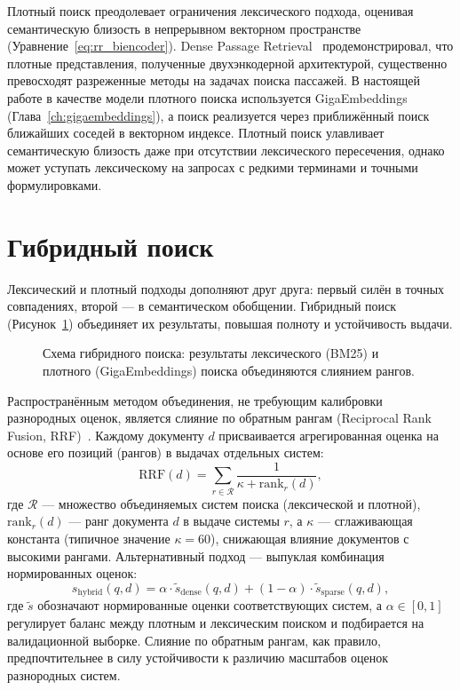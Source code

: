 Плотный поиск преодолевает ограничения лексического подхода, оценивая семантическую близость в непрерывном векторном пространстве (Уравнение~\ref{eq:rr_biencoder}).
Dense Passage Retrieval~\cite{2004.04906} продемонстрировал, что плотные представления, полученные двухэнкодерной архитектурой, существенно превосходят разреженные методы на задачах поиска пассажей.
В настоящей работе в качестве модели плотного поиска используется GigaEmbeddings (Глава~\ref{ch:gigaembeddings}), а поиск реализуется через приближённый поиск ближайших соседей в векторном индексе.
Плотный поиск улавливает семантическую близость даже при отсутствии лексического пересечения, однако может уступать лексическому на запросах с редкими терминами и точными формулировками.

\section{Гибридный поиск}\label{sec:rag_hybrid}

Лексический и плотный подходы дополняют друг друга: первый силён в точных совпадениях, второй --- в семантическом обобщении.
Гибридный поиск (Рисунок~\ref{fig:hybrid_search}) объединяет их результаты, повышая полноту и устойчивость выдачи.

\begin{figure}[htbp]
    \centering
    \resizebox{0.92\textwidth}{!}{
        
    }
    \caption{Схема гибридного поиска: результаты лексического (BM25) и плотного (GigaEmbeddings) поиска объединяются слиянием рангов.}
    \label{fig:hybrid_search}
\end{figure}

Распространённым методом объединения, не требующим калибровки разнородных оценок, является слияние по обратным рангам (Reciprocal Rank Fusion, RRF)~\cite{cormack2009rrf}.
Каждому документу $d$ присваивается агрегированная оценка на основе его позиций (рангов) в выдачах отдельных систем:
\begin{equation}
\label{eq:rrf}
    \mathrm{RRF}(d) = \sum_{r \in \mathcal{R}} \frac{1}{\kappa + \mathrm{rank}_r(d)},
\end{equation}
где $\mathcal{R}$ --- множество объединяемых систем поиска (лексической и плотной), $\mathrm{rank}_r(d)$ --- ранг документа $d$ в выдаче системы $r$, а $\kappa$ --- сглаживающая константа (типичное значение $\kappa = 60$), снижающая влияние документов с высокими рангами.
Альтернативный подход --- выпуклая комбинация нормированных оценок:
\begin{equation}
\label{eq:hybrid_convex}
    s_{\text{hybrid}}(q, d) = \alpha \cdot \tilde{s}_{\text{dense}}(q, d) + (1 - \alpha) \cdot \tilde{s}_{\text{sparse}}(q, d),
\end{equation}
где $\tilde{s}$ обозначают нормированные оценки соответствующих систем, а $\alpha \in [0, 1]$ регулирует баланс между плотным и лексическим поиском и подбирается на валидационной выборке.
Слияние по обратным рангам, как правило, предпочтительнее в силу устойчивости к различию масштабов оценок разнородных систем.

